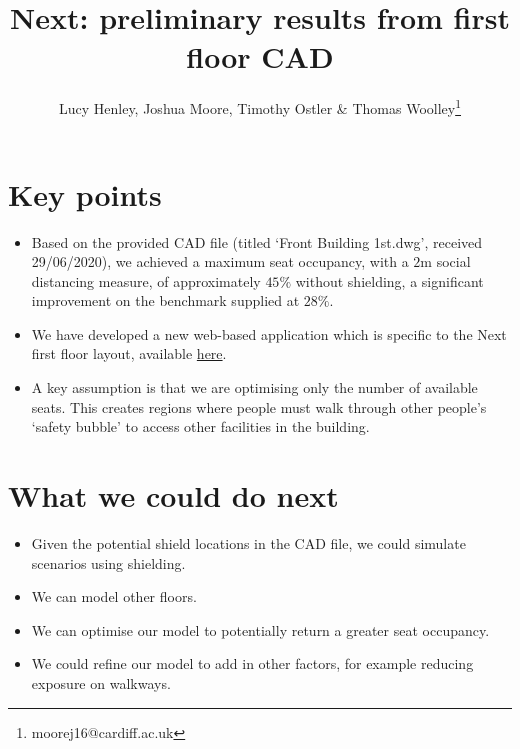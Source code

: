 \documentclass[11pt,a4paper]{article}
\title{Next: preliminary results from first floor CAD}
\author{Lucy Henley, Joshua Moore, Timothy Ostler \& Thomas Woolley\footnote{moorej16@cardiff.ac.uk}}
\begin{document}
\maketitle

\section*{Key points}
\begin{itemize}
\item Based on the provided CAD file (titled `Front Building 1st.dwg', received 29/06/2020), we achieved a maximum seat occupancy, with a $2$m social distancing measure, of approximately $45\%$ without shielding, a significant improvement on the benchmark supplied at $28\%$.
\item We have developed a new web-based application which is specific to the Next first floor layout, available \href{https://lucyhenley.shinyapps.io/Next_seating/?fbclid=IwAR2Rx-OmoSkYHlw6BnQSKLgJGQt7VJvaX2IJYbqgKu4MK9YZxoZn1gBBAaEp}{here}. %
\item A key assumption is that we are optimising only the number of available seats. This creates regions where people must walk through other people's `safety bubble' to access other facilities in the building.
\end{itemize}

\section*{What we could do next}
\begin{itemize}
\item Given the potential shield locations in the CAD file, we could simulate scenarios using shielding.
\item We can model other floors.
\item We can optimise our model to potentially return a greater seat occupancy.
\item We could refine our model to add in other factors, for example reducing exposure on walkways.
\end{itemize}
\end{document}

